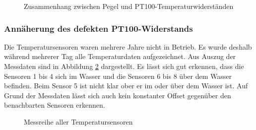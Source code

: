 \begin{figure}[htbp]
	\centering
	\caption{Zusammenhang zwischen Pegel und PT100-Temperaturwiderständen}
	\label{img:wassertempsensoren}
\end{figure}


\subsubsection{Annäherung des defekten PT100-Widerstands}
Die Temperatursensoren waren mehrere Jahre nicht in Betrieb. Es wurde deshalb während mehrerer Tag alle Temperaturdaten aufgezeichnet. Aus Auszug der Messdaten sind in Abbildung \ref{img:tempSensoren} dargestellt. Es lässt sich gut erkennen, dass die Sensoren 1 bis 4 sich im Wasser und die Sensoren 6 bis 8 über dem Wasser befinden. Beim Sensor 5 ist nicht klar ober er im oder über dem Wasser ist. Auf Grund der Messdaten lässt sich auch kein konstanter Offset gegenüber den benachbarten Sensoren erkennen.

\begin{figure}[htbp]
	\centering
	\caption{Messreihe aller Temperatursensoren}
	\label{img:tempSensoren}
\end{figure}

